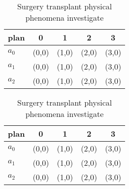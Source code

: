 \documentclass[a4paper]{article}
\begin{document}
\begin{table}
\begin{adjustbox}{width=0.5\columnwidth}
\begin{tabular}{|l|l|l|l|l|}
\hline
\textbf{plan} & \multicolumn{1}{c|}{\textbf{0}} & \multicolumn{1}{c|}{\textbf{1}} & \multicolumn{1}{c|}{\textbf{2}} & \multicolumn{1}{c|}{\textbf{3}} \\ \hline
\textbf{$a_0$}  & (0,0) & (1,0) & (2,0) & (3,0) \\ \hline
\textbf{$a_1$}  & (0,0) & (1,0) & (2,0) & (3,0) \\ \hline
\textbf{$a_2$}  & (0,0) & (1,0) & (2,0) & (3,0) \\ \hline
\end{tabular}
\end{adjustbox}
\caption{Surgery transplant physical phenomena investigate
}
\end{table}

\begin{table}
\begin{adjustbox}{width=0.5\columnwidth}
\begin{tabular}{|l|l|l|l|l|}
\hline
\textbf{plan} & \multicolumn{1}{c|}{\textbf{0}} & \multicolumn{1}{c|}{\textbf{1}} & \multicolumn{1}{c|}{\textbf{2}} & \multicolumn{1}{c|}{\textbf{3}} \\ \hline
\textbf{$a_0$}  & (0,0) & (1,0) & (2,0) & (3,0) \\ \hline
\textbf{$a_1$}  & (0,0) & (1,0) & (2,0) & (3,0) \\ \hline
\textbf{$a_2$}  & (0,0) & (1,0) & (2,0) & (3,0) \\ \hline
\end{tabular}
\end{adjustbox}
\caption{Surgery transplant physical phenomena investigate
}
\end{table}
\end{document}

